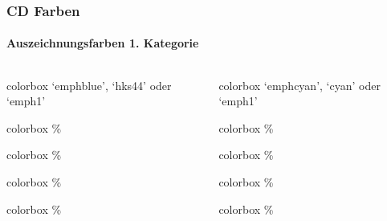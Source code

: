 \documentclass[german,notoc]{tudbeamer}%
\begin{document}
\begin{frame}
	\frametitle{CD Farben}
	\framesubtitle{Auszeichnungsfarben 1. Kategorie}

	\begin{columns}[T]
		\begin{column}{.4\textwidth}%
			\begin{beamercolorbox}[wd=0.9\textwidth,sep=1em]{colorbox}
				\centering `emphblue', `hks44' oder `emph1'
		    \end{beamercolorbox}
			\begin{beamercolorbox}[wd=0.9\textwidth,sep=1em]{colorbox}
				\%
		    \end{beamercolorbox}
			\begin{beamercolorbox}[wd=0.9\textwidth,sep=1em]{colorbox}
				\%
		    \end{beamercolorbox}
			\begin{beamercolorbox}[wd=0.9\textwidth,sep=1em]{colorbox}
				\%
		    \end{beamercolorbox}
			\begin{beamercolorbox}[wd=0.9\textwidth,sep=1em]{colorbox}
				\%
		    \end{beamercolorbox}
		\end{column}

		\begin{column}{.4\textwidth}%
			\begin{beamercolorbox}[wd=0.9\textwidth,sep=1em]{colorbox}
				\centering `emphcyan', `cyan' oder `emph1'
		    \end{beamercolorbox}
			\begin{beamercolorbox}[wd=0.9\textwidth,sep=1em]{colorbox}
				\%
		    \end{beamercolorbox}
			\begin{beamercolorbox}[wd=0.9\textwidth,sep=1em]{colorbox}
				\%
		    \end{beamercolorbox}
			\begin{beamercolorbox}[wd=0.9\textwidth,sep=1em]{colorbox}
				\%
		    \end{beamercolorbox}
			\begin{beamercolorbox}[wd=0.9\textwidth,sep=1em]{colorbox}
				\%
		    \end{beamercolorbox}
		\end{column}
	\end{columns}
\end{frame}
\end{document}
